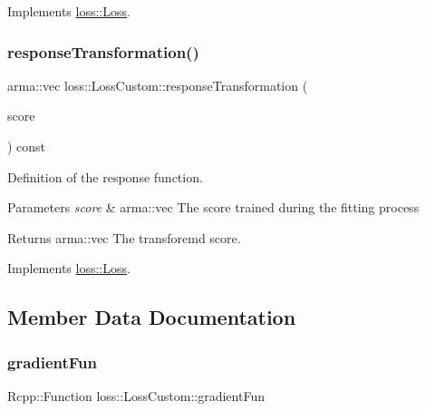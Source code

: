 Implements \mbox{\hyperlink{classloss_1_1_loss_ae9f94dd9b8311397583ba3a9cb485e94}{loss\+::\+Loss}}.

\mbox{\label{classloss_1_1_loss_custom_a42d9a0131836a056551c1073474cc8b9}} 
\subsubsection{\texorpdfstring{response\+Transformation()}{responseTransformation()}}
{\footnotesize\ttfamily arma\+::vec loss\+::\+Loss\+Custom\+::response\+Transformation (\begin{DoxyParamCaption}\item[{const arma\+::vec \&}]{score }\end{DoxyParamCaption}) const\hspace{0.3cm}{\ttfamily [virtual]}}



Definition of the response function. 


\begin{DoxyParams}{Parameters}
{\em score} & {\ttfamily arma\+::vec} The score trained during the fitting process\\
\hline
\end{DoxyParams}
\begin{DoxyReturn}{Returns}
{\ttfamily arma\+::vec} The transforemd score. 
\end{DoxyReturn}


Implements \mbox{\hyperlink{classloss_1_1_loss_a0a84b7df79b08e40b538aaa7e6ee75c4}{loss\+::\+Loss}}.



\subsection{Member Data Documentation}
\mbox{\label{classloss_1_1_loss_custom_a320a637329b5ae7d60c9493dc757c077}} 
\subsubsection{\texorpdfstring{gradient\+Fun}{gradientFun}}
{\footnotesize\ttfamily Rcpp\+::\+Function loss\+::\+Loss\+Custom\+::gradient\+Fun\hspace{0.3cm}{\ttfamily [private]}}



